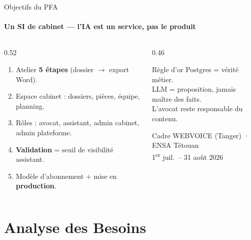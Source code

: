 \documentclass[aspectratio=169, t]{beamer}
\begin{document}
\begin{frame}{Objectifs du PFA}
\framesubtitle{Un SI de cabinet --- l'IA est un service, pas le produit}

\begin{columns}[T,onlytextwidth]
\begin{column}{0.52\textwidth}
  \begin{enumerate}
    \item Atelier \textbf{5 étapes} (dossier $\rightarrow$ export Word).
    \item Espace cabinet : dossiers, pièces, équipe, planning.
    \item Rôles : avocat, assistant, admin cabinet, admin plateforme.
    \item \textbf{Validation} = seuil de visibilité assistant.
    \item Modèle d'abonnement + mise en \textbf{production}.
  \end{enumerate}
\end{column}
\begin{column}{0.46\textwidth}
  \begin{exampleblock}{Règle d'or}
    Postgres = vérité métier.\\
    LLM = proposition, jamais maître des faits.\\
    L'avocat reste responsable du contenu.
  \end{exampleblock}
  \begin{block}{Cadre}
    WEBVOICE (Tanger) · ENSA Tétouan\\
    1\textsuperscript{er} juil.\ -- 31 août 2026
  \end{block}
\end{column}
\end{columns}
\end{frame}

\section{Analyse des Besoins}
\end{document}
